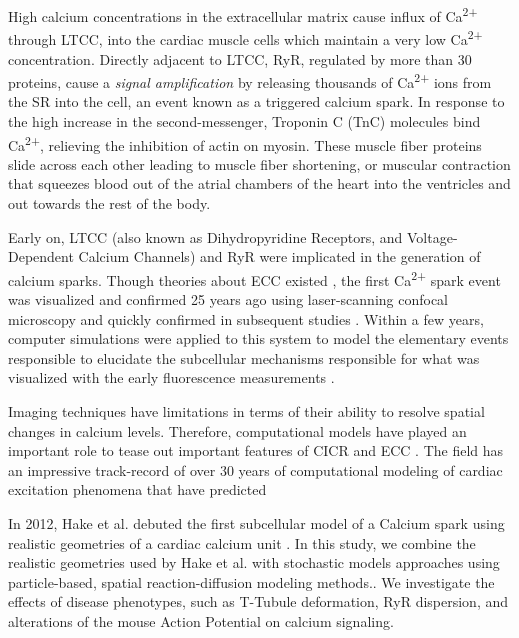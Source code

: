 \documentclass[12pt]{ucsddissertation}
\begin{document}
High calcium concentrations in the extracellular matrix cause influx of Ca\textsuperscript{2+} through LTCC, into the cardiac muscle cells which maintain a very low Ca\textsuperscript{2+}  concentration. Directly adjacent to LTCC, RyR, regulated by more than 30 proteins\cite{Fill2002}, cause a \textit{signal amplification} by releasing thousands of Ca\textsuperscript{2+}  ions from the SR into the cell, an event known as a triggered calcium spark. In response to the high increase in the second-messenger, Troponin C (TnC) molecules bind Ca\textsuperscript{2+}, relieving the inhibition of actin on myosin. These muscle fiber proteins slide across each other leading to muscle fiber shortening, or muscular contraction that squeezes blood out of the atrial chambers of the heart into the ventricles and out towards the rest of the body. 

Early on, LTCC (also known as Dihydropyridine Receptors, and Voltage-Dependent Calcium Channels) \cite{Lu1994} and RyR \cite{Stern1999} were implicated in the generation of calcium sparks. Though theories about ECC existed \cite{Stern1992}, the first Ca\textsuperscript{2+} spark event was visualized and confirmed 25 years ago using laser-scanning confocal microscopy \cite{Cheng1993} and quickly confirmed in subsequent studies \cite{Cannell1994,Cannell1995}. Within a few years, computer simulations were applied to this system to model the elementary events responsible to elucidate the subcellular mechanisms responsible for what was visualized with the early fluorescence measurements \cite{Cannell1997}.

Imaging techniques have limitations in terms of their ability to resolve spatial changes in calcium levels. Therefore, computational models have played an important role to tease out important features of CICR and ECC \cite{Maleckar2017}. The field has an impressive track-record of over 30 years of computational modeling of cardiac excitation phenomena that have predicted 

In 2012, Hake et al. debuted the first subcellular model of a Calcium spark \cite{Hake2012} using realistic geometries of a cardiac calcium unit \cite{Hayashi2009}.  In this study, we combine the realistic geometries used by Hake et al. with stochastic models approaches using particle-based, spatial reaction-diffusion modeling methods.\cite{Hirakis2018}. We investigate the effects of disease phenotypes, such as T-Tubule deformation\cite{Louch2010}, RyR dispersion\cite{Kolstad2018}, and alterations of the mouse Action Potential\cite{Morotti2014} on calcium signaling. 
\end{document}
